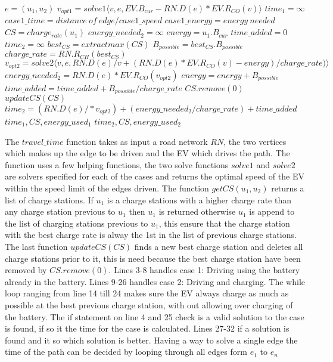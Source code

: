 \begin{algorithmic}[1]
	\State $e = (u_1, u_2)$
	\State $v_{opt1} = solve1\langle v, e, EV.B_{cur}-RN.D(e)*EV.R_{CO}(v)\rangle$
		\State $time_1 = \infty$
	\Else
		\State $case1\_time = distance\:of\:edge / case1\_speed$
		\State $case1\_energy = energy\:needed$
	\EndIf
		\State $CS = charge_{rate}(u_1)$ 
		\State $energy\_needed_{2} = \infty$
		\State $energy = u_1.B_{cur}$
		\State $time\_added = 0$
		\State $time_2 = \infty$
		\State $best_{CS} = extractmax(CS)$
		\State $B_{possible} = best_{CS}.B_{possible}$
		\State $charge\_rate = RN.R_{CH}(best_{CS})$
		\State $v_{opt2} = solve2 \langle v, e,  RN.D(e)/v + (RN.D(e)* 
			EV.R_{CO}(v)-energy)/charge\_rate) \rangle$
		\State $energy\_needed_{2} = RN.D(e)*EV.R_{CO}(v_{opt2})$
		\State $energy = energy + B_{possible}$
			\State $time\_added = time\_added + B_{possible}/charge\_rate$
			\State $CS.remove(0)$
			\State $updateCS(CS)$
		\EndIf	
	\EndWhile
		\State $time_2 = (RN.D(e)/*v_{opt2}) + (energy\_needed_{2}/charge\_rate) + time\_added$
	\EndIf
		\State \Return $time_1, CS, energy\_used_1$
	\Else
		\State \Return $time_2, CS, energy\_used_2$
	\EndIf
\EndFunction
\end{algorithmic}\label{alg:fastest_path}

The $travel\_time$ function takes as input a road network $RN$, the two vertices which makes up the edge to be driven and the EV which drives the path. The function uses a few helping functions, the two solve functions $solve1$ and $solve2$ are solvers specified for each of the cases and returns the optimal speed of the EV within the speed limit of the edges driven. The function $getCS(u_1, u_2)$ returns a list of charge stations. If $u_1$ is a charge stations with a higher charge rate than any charge station previous to $u_1$ then $u_1$ is returned otherwise $u_1$ is append to the list of charging stations previous to $u_1$, this ensure that the charge station with the best charge rate is alway the 1st in the list of previous charge stations. The last function $updateCS(CS)$ finds a new best charge station and deletes all charge stations prior to it, this is need because the best charge station have been removed by $CS.remove(0)$. Lines 3-8 handles case 1: Driving using the battery already in the battery. Lines 9-26 handles case 2: Driving and charging. The while loop ranging from line 14 till 24 makes sure the EV always charge as much as possible at the best previous charge station, with out allowing over charging of the battery. The if statement on line 4 and 25 check is a valid solution to the case is found, if so it the time for the case is calculated. Lines 27-32 if a solution is found and it so which solution is better. Having a way to solve a single edge the time of the path can be decided by looping through all edges form $e_1$ to $e_n$

